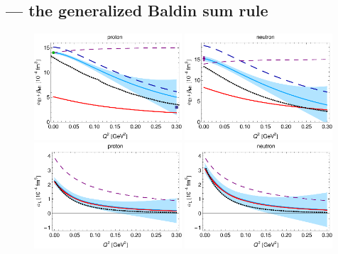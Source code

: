 \documentclass[12pt,preprint,tightenlines,
showpacs,preprintnumbers,amsmath,amssymb,
a4paper,nofootinbib]{revtex4-2}
\begin{document}
\label{Sec:Scalar-Pol}

\subsection{ --- the generalized Baldin sum rule}
\label{M12genBS}

\begin{figure}[hbt]
\begin{center}
 \includegraphics[width=0.49\textwidth]{alpha+beta_p-Dip.pdf}
  \includegraphics[width=0.49\textwidth]{alpha+beta_n-Dip.pdf}\\[0.2cm]
   \includegraphics[width=0.49\textwidth]{alphaL_p.pdf}
    \includegraphics[width=0.49\textwidth]{alphaL_n.pdf}

\end{center}
\end{figure}
\end{document}
